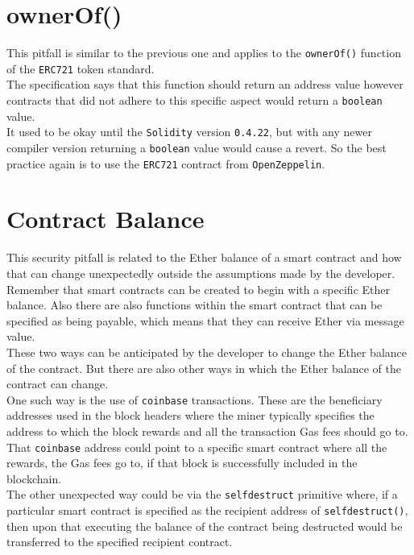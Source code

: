 \section{ownerOf()}

This pitfall is similar to the previous one and applies to the \texttt{ownerOf()} function of the \texttt{ERC721} token standard. \\

The specification says that this function should return an address value however contracts that did not adhere to this specific aspect would return a \texttt{boolean} value. \\

It used to be okay until the \texttt{Solidity} version \texttt{0.4.22}, but with any newer compiler version returning a \texttt{boolean} value would cause a revert. So the best practice again is to use the \texttt{ERC721} contract from \texttt{OpenZeppelin}.

\section{Contract Balance}

This security pitfall is related to the Ether balance of a smart contract and how that can change unexpectedly outside the assumptions made by the developer.\\

Remember that smart contracts can be created to begin with a specific Ether balance. Also there are also functions within the smart contract that can be specified as being payable, which means that they can receive Ether via message value. \\

These two ways can be anticipated by the developer to change the Ether balance of the contract. But there are also other ways in which the Ether balance of the contract can change.\\

One such way is the use of \texttt{coinbase} transactions. These are the beneficiary addresses used in the block headers where the miner typically specifies the address to which the block rewards and all the transaction Gas fees should go to. That \texttt{coinbase} address could point to a specific smart contract where all the rewards, the Gas fees go to, if that block is successfully included in the blockchain.\\

The other unexpected way could be via the \texttt{selfdestruct} primitive where, if a particular smart contract is specified as the recipient address of \texttt{selfdestruct()}, then upon that executing the balance of the contract being destructed would be transferred to the specified recipient contract.\\

